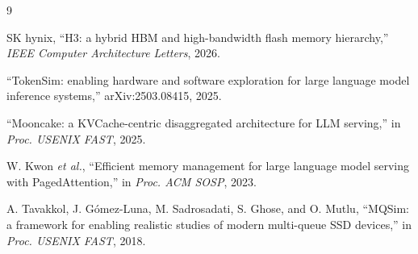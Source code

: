 \documentclass[conference]{IEEEtran}
\begin{document}
\begin{thebibliography}{9}

SK hynix,
``H3: a hybrid HBM and high-bandwidth flash memory hierarchy,''
\emph{IEEE Computer Architecture Letters}, 2026.

``TokenSim: enabling hardware and software exploration for large language model
inference systems,'' arXiv:2503.08415, 2025.

``Mooncake: a KVCache-centric disaggregated architecture for LLM serving,''
in \emph{Proc. USENIX FAST}, 2025.

W. Kwon \emph{et al.},
``Efficient memory management for large language model serving with
PagedAttention,''
in \emph{Proc. ACM SOSP}, 2023.

A. Tavakkol, J. G\'{o}mez-Luna, M. Sadrosadati, S. Ghose, and O. Mutlu,
``MQSim: a framework for enabling realistic studies of modern multi-queue SSD
devices,''
in \emph{Proc. USENIX FAST}, 2018.

\end{thebibliography}
\end{document}
